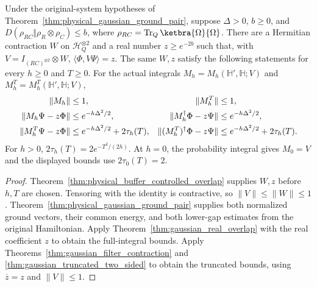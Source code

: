 \begin{theorem}
    \label{thm:physical_buffer_gaussian_filter}
    \leanok
    Under the original-system hypotheses of
    Theorem~\ref{thm:physical_gaussian_ground_pair}, suppose $\Delta>0$,
    $b\ge0$, and
    $D(\rho_{RC}\Vert\rho_R\otimes\rho_C)\le b$, where
    $\rho_{RC}=\operatorname{Tr}_Q\ketbra{\Omega}{\Omega}$.
    There are a Hermitian contraction $W$ on $\mathcal H_Q^{\otimes2}$
    and a real number $z\ge e^{-2b}$ such that, with
    $V=I_{(RC)^{\otimes2}}\otimes W$,
    $\langle\Phi,V\Psi\rangle=z$.
    The same $W,z$ satisfy the following statements for every $h\ge0$
    and $T\ge0$. For the actual integrals
    $M_h=M_h(\mathbb H',\mathbb H;V)$ and
    $M_h^T=M_h^T(\mathbb H',\mathbb H;V)$,
    \begin{align}
        \|M_h\|&\le1, & \|M_h^T\|&\le1,
            \label{eq:physical_gaussian_errors}\\
        \|M_h\Psi-z\Phi\|&\le e^{-h\Delta^2/2},
            & \|M_h^\dagger\Phi-z\Psi\|&\le e^{-h\Delta^2/2},
            \notag\\
        \|M_h^T\Psi-z\Phi\|&\le e^{-h\Delta^2/2}+2\tau_h(T),
            & \|(M_h^T)^\dagger\Phi-z\Psi\|&\le
                e^{-h\Delta^2/2}+2\tau_h(T).
            \notag
    \end{align}
    For $h>0$, $2\tau_h(T)=2e^{-T^2/(2h)}$. At $h=0$, the probability
    integral gives $M_0=V$ and the displayed bounds use $2\tau_0(T)=2$.
\end{theorem}
\begin{proof}\leanok
    Theorem~\ref{thm:physical_buffer_controlled_overlap} supplies $W,z$
    before $h,T$ are chosen. Tensoring with the identity is contractive,
    so $\|V\|\le\|W\|\le1$.
    Theorem~\ref{thm:physical_gaussian_ground_pair} supplies both normalized
    ground vectors, their common energy, and both lower-gap estimates
    from the original Hamiltonian.
    Apply Theorem~\ref{thm:gaussian_real_overlap} with the real coefficient
    $z$ to obtain the full-integral bounds. Apply
    Theorems~\ref{thm:gaussian_filter_contraction} and
    \ref{thm:gaussian_truncated_two_sided} to obtain the truncated bounds,
    using $\overline z=z$ and $\|V\|\le1$.
\end{proof}
